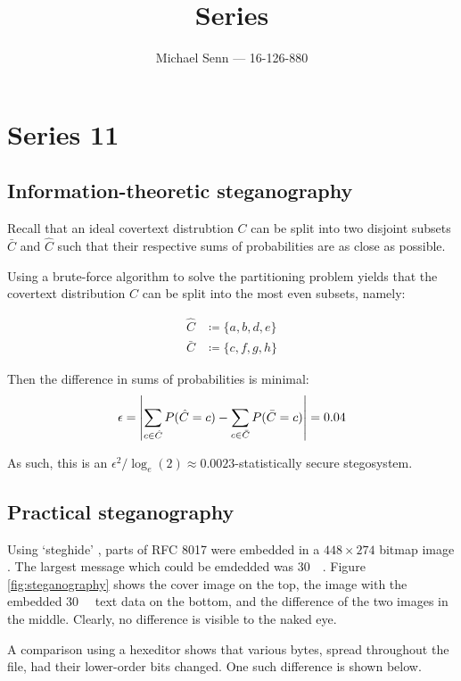 \documentclass[a4paper]{scrreprt}
\title{Series \series}
\author{Michael Senn \maillink{michael.senn@students.unibe.ch} --- 16-126-880}
\date{\printdate}
\DeclarePairedDelimiter\abs{\lvert}{\rvert}
\newcommand{\series}{11}
\begin{document}
\maketitle


\setcounter{chapter}{\numexpr \series - 1 \relax}

\chapter{Series \series}

\section{Information-theoretic steganography}

Recall that an ideal covertext distrubtion $C$ can be split into two disjoint
subsets $\bar{C}$ and $\hat{C}$ such that their respective sums of
probabilities are as close as possible.

Using a brute-force algorithm to solve the partitioning problem yields that the
covertext distribution $C$ can be split into the most even subsets, namely:

\begin{align*}
		\hat{C} & \coloneqq \{a, b, d, e\} \\
		\bar{C} & \coloneqq \{c, f, g, h\}
\end{align*}

Then the difference in sums of probabilities is minimal:
\[
		\epsilon = \abs*{
				\sum_{c \in \hat{C}} P(\hat{C} = c) - 
		        \sum_{c \in \bar{C}} P(\bar{C} = c)} 
		= 0.04
\]

As such, this is an $\epsilon^2 / \log_e(2) \approx 0.0023$-statistically
secure stegosystem.

\section{Practical steganography}

Using `steghide' \autocite{hetzlGraphTheoreticApproach2005}, parts of RFC 8017
\autocite{rfc8017} were embedded in a $448 \times 274$ bitmap image
\autocite{munroeXkcd538Security}.  The largest message which could be emdedded
was \SI{30}{\kilo\byte}.  Figure \ref{fig:steganography} shows the cover image
on the top, the image with the embedded \SI{30}{\kilo\byte} text data on the
bottom, and the difference of the two images in the middle.  Clearly, no
difference is visible to the naked eye.

A comparison using a hexeditor shows that various bytes, spread throughout the
file, had their lower-order bits changed. One such difference is shown below.
\end{document}
